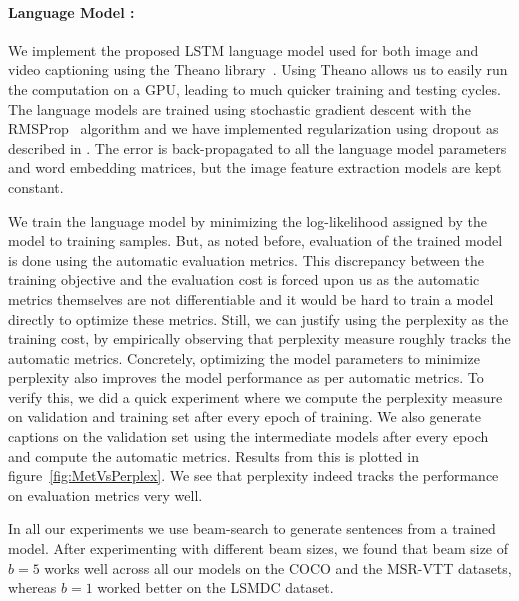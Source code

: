 \paragraph*{Language Model :} We implement the proposed LSTM language model used
for both image and video captioning using the Theano
library~\cite{Bastien-Theano-2012}.
Using Theano allows us to easily run the computation on a GPU, leading to
much quicker training and testing cycles.
The language models are trained using stochastic gradient descent with the
RMSProp~\cite{rmspropTielman} algorithm and we have implemented regularization
using dropout as described in \cite{ZarembaSV14}.
The error is back-propagated to all the language model parameters and word
embedding matrices, but the image feature extraction models are kept constant.
%

We train the language model by minimizing the log-likelihood assigned by the
model to training samples.
But, as noted before, evaluation of the trained model is done using the automatic
evaluation metrics.
This discrepancy between the training objective and the evaluation cost is
forced upon us as the automatic metrics themselves are not differentiable and it
would be hard to train a model directly to optimize these metrics.
Still, we can justify using the perplexity as the training cost, by empirically
observing that perplexity measure roughly tracks the automatic metrics.
Concretely, optimizing the model parameters to minimize perplexity also improves the
model performance as per automatic metrics.
To verify this, we did a quick experiment where we compute the perplexity
measure on validation and training set after every epoch of training.
We also generate captions on the validation set using the intermediate models
after every epoch and compute the automatic metrics.
Results from this is plotted in figure~\ref{fig:MetVsPerplex}.
We see that perplexity indeed tracks the performance on evaluation metrics very
well.

In all our experiments we use beam-search to generate sentences from a trained
model.
After experimenting with different beam sizes, we found that beam size of $b=5$
works well across all our models on the COCO and the MSR-VTT datasets, whereas
$b=1$ worked better on the LSMDC dataset.

